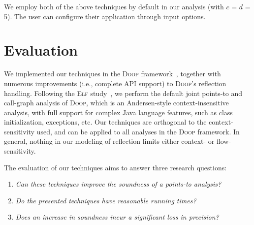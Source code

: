 We employ both of the above techniques by default in our analysis
(with $c$ = $d$ = 5). The user can configure their application
through input options.






\section{Evaluation}
\label{reflection/sec:experiments}

We implemented our techniques in the \textsc{Doop}
framework~\cite{oopsla/BravenboerS09}, together with numerous
improvements (i.e., complete API support) to
\textsc{Doop}'s reflection handling. 
Following the \textsc{Elf} study~\cite{ecoop/LiTSX14}, we perform the
default joint points-to and call-graph analysis of \textsc{Doop},
which is an Andersen-style context-insensitive analysis, with full
support for complex Java language features, such as class
initialization, exceptions, etc. Our techniques are orthogonal to the
context-sensitivity used, and can be applied to all analyses in the
\textsc{Doop} framework. In general, nothing in our modeling of
reflection limits either context- or flow-sensitivity.

The evaluation of our techniques aims to answer three research
questions:

\begin{enumerate}[\bfseries {RQ}1:]
\item \emph{Can these techniques improve the soundness of a
    points-to analysis?}
\item \emph{Do the presented techniques have reasonable running times?}
\item \emph{Does an increase in soundness incur a significant loss in precision?}
\end{enumerate}


